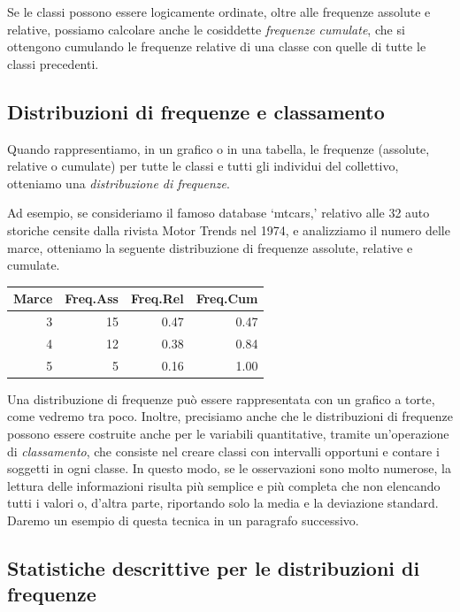 \documentclass[a4paper,12pt,oneside]{book}
\begin{document}
Se le classi possono essere logicamente ordinate, oltre alle frequenze assolute e relative, possiamo calcolare anche le cosiddette \emph{frequenze cumulate}, che si ottengono cumulando le frequenze relative di una classe con quelle di tutte le classi precedenti.

\hypertarget{distribuzioni-di-frequenze-e-classamento}{%
\subsection{Distribuzioni di frequenze e classamento}\label{distribuzioni-di-frequenze-e-classamento}}

Quando rappresentiamo, in un grafico o in una tabella, le frequenze (assolute, relative o cumulate) per tutte le classi e tutti gli individui del collettivo, otteniamo una \emph{distribuzione di frequenze}.

Ad esempio, se consideriamo il famoso database `mtcars,' relativo alle 32 auto storiche censite dalla rivista Motor Trends nel 1974, e analizziamo il numero delle marce, otteniamo la seguente distribuzione di frequenze assolute, relative e cumulate.

\begin{tabular}{r|r|r|r}
\hline
Marce & Freq.Ass & Freq.Rel & Freq.Cum\\
\hline
3 & 15 & 0.47 & 0.47\\
\hline
4 & 12 & 0.38 & 0.84\\
\hline
5 & 5 & 0.16 & 1.00\\
\hline
\end{tabular}

Una distribuzione di frequenze può essere rappresentata con un grafico a torte, come vedremo tra poco. Inoltre, precisiamo anche che le distribuzioni di frequenze possono essere costruite anche per le variabili quantitative, tramite un'operazione di \emph{classamento}, che consiste nel creare classi con intervalli opportuni e contare i soggetti in ogni classe. In questo modo, se le osservazioni sono molto numerose, la lettura delle informazioni risulta più semplice e più completa che non elencando tutti i valori o, d'altra parte, riportando solo la media e la deviazione standard. Daremo un esempio di questa tecnica in un paragrafo successivo.

\hypertarget{statistiche-descrittive-per-le-distribuzioni-di-frequenze}{%
\subsection{Statistiche descrittive per le distribuzioni di frequenze}\label{statistiche-descrittive-per-le-distribuzioni-di-frequenze}}
\end{document}
